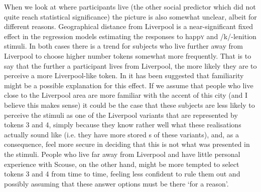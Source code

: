 When we look at where participants live (the other social predictor which did not quite reach statistical significance) the picture is also somewhat unclear, albeit for different reasons.
Geographical distance from Liverpool is a near-significant fixed effect in the regression models estimating the responses to happ\textsc{y} and /k/-lenition stimuli.
In both cases there is a trend for subjects who live further away from Liverpool to choose higher number tokens somewhat more frequently.
That is to say that the further a participant lives from Liverpool, the more likely they are to perceive a more Liverpool-like token.
In  it has been suggested that familiarity might be a possible explanation for this effect.
If we assume that people who live close to the Liverpool area are more familiar with the accent of this city (and I believe this makes sense) it could be the case that these subjects are less likely to perceive the stimuli as one of the Liverpool variants that are represented by tokens 3 and 4, simply because they know rather well what these realisations actually sound like (i.e. they have more stored s of these variants), and, as a consequence, feel more secure in deciding that this is not what was presented in the stimuli.
People who live far away from Liverpool and have little personal experience with Scouse, on the other hand, might be more tempted to select tokens 3 and 4 from time to time, feeling less confident to rule them out and possibly assuming that these answer options must be there `for a reason'.

